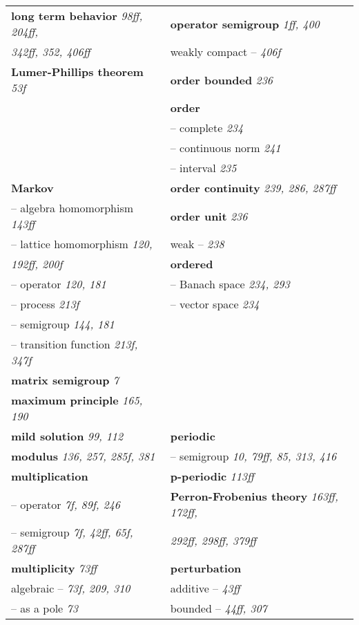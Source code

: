 \documentclass{article}
\begin{document}
\begin{longtable}{p{}p{}}
\textbf{long term behavior} \textit{98ff, 204ff,} & \textbf{operator semigroup} \textit{1ff, 400} \\
\quad \textit{342ff, 352, 406ff} & \quad weakly compact -- \textit{406f} \\
\textbf{Lumer-Phillips theorem} \textit{53f} & \textbf{order bounded} \textit{236} \\
& \textbf{order} \\
& \quad -- complete \textit{234} \\
& \quad -- continuous norm \textit{241} \\
& \quad -- interval \textit{235} \\
\textbf{Markov} & \textbf{order continuity} \textit{239, 286, 287ff} \\
\quad -- algebra homomorphism \textit{143ff} & \textbf{order unit} \textit{236} \\
\quad -- lattice homomorphism \textit{120,} & \quad weak -- \textit{238} \\
\quad\quad \textit{192ff, 200f} & \textbf{ordered} \\
\quad -- operator \textit{120, 181} & \quad -- Banach space \textit{234, 293} \\
\quad -- process \textit{213f} & \quad -- vector space \textit{234} \\
\quad -- semigroup \textit{144, 181} & \\
\quad -- transition function \textit{213f, 347f} & \\
\textbf{matrix semigroup} \textit{7} & \\
\textbf{maximum principle} \textit{165, 190} & \\
\textbf{mild solution} \textit{99, 112} & \textbf{periodic} \\
\textbf{modulus} \textit{136, 257, 285f, 381} & \quad -- semigroup \textit{10, 79ff, 85, 313, 416} \\
\textbf{multiplication} & \textbf{p-periodic} \textit{113ff} \\
\quad -- operator \textit{7f, 89f, 246} & \textbf{Perron-Frobenius theory} \textit{163ff, 172ff,} \\
\quad -- semigroup \textit{7f, 42ff, 65f, 287ff} & \quad \textit{292ff, 298ff, 379ff} \\
\textbf{multiplicity} \textit{73ff} & \textbf{perturbation} \\
\quad algebraic -- \textit{73f, 209, 310} & \quad additive -- \textit{43ff} \\
\quad -- as a pole \textit{73} & \quad bounded -- \textit{44ff, 307} \\

\end{longtable}
\end{document}
